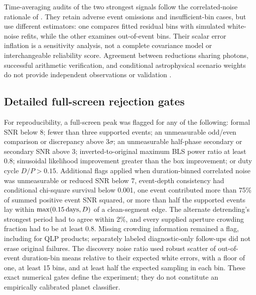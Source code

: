 Time-averaging audits of the two strongest signals follow the correlated-noise
rationale of \cite{pont2006}. They retain adverse event omissions and
insufficient-bin cases, but use different estimators: one compares fitted
residual bins with simulated white-noise refits, while the other examines
out-of-event bins. Their scalar error inflation is a sensitivity analysis,
not a complete covariance model or interchangeable reliability score.
Agreement between reductions sharing photons, successful arithmetic
verification, and conditional astrophysical scenario weights do not provide
independent observations or validation \cite{giacalone2021}.

\subsection{Detailed full-screen rejection gates}
\label{sec:screen-gates}

For reproducibility, a full-screen peak was flagged for any of the following:
formal SNR below 8; fewer than three supported events; an unmeasurable
odd/even comparison or discrepancy above $3\sigma$; an unmeasurable
half-phase secondary or secondary SNR above 3; inverted-to-original
maximum BLS power ratio at least 0.8; sinusoidal likelihood improvement
greater than the box improvement; or duty cycle $D/P>0.15$.
Additional flags applied when duration-binned correlated noise was
unmeasurable or reduced SNR below 7, event-depth consistency had conditional
chi-square survival below 0.001, one event contributed more than 75\%
of summed positive event SNR squared, or more than half the supported
events lay within $\max(0.15\,{\rm days},D)$ of a clean-segment edge.
The alternate detrending's strongest period had to agree within 2\%,
and every supplied aperture crowding fraction had to be at least 0.8.
Missing crowding information remained a flag, including for QLP products;
separately labeled diagnostic-only follow-ups did not erase original failures.
The discovery noise ratio used robust scatter of out-of-event duration-bin
means relative to their expected white errors, with a floor of one,
at least 15 bins, and at least half the expected sampling in each bin.
These exact numerical gates define the experiment; they do not constitute
an empirically calibrated planet classifier.
